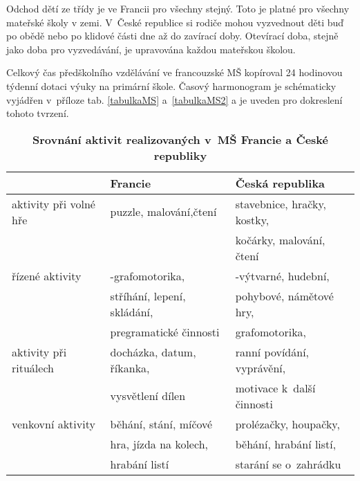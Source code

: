 	Odchod dětí ze třídy je ve Francii pro všechny stejný. Toto je platné pro všechny mateřské školy v zemi. V~České republice si rodiče mohou vyzvednout děti buď po obědě nebo po klidové části dne až do zavírací doby. Otevírací doba, stejně jako doba pro vyzvedávání, je upravována každou mateřskou školou.

	Celkový čas předškolního vzdělávání ve francouzské MŠ kopíroval 24 hodinovou týdenní dotaci výuky na primární škole. Časový harmonogram je schématicky vyjádřen v~příloze tab. \ref{tabulkaMS} a~\ref{tabulkaMS2} a je uveden pro dokreslení tohoto tvrzení.


\begin{table}[h]
	\center
	\begin{tabular}{|l|l|l|}
	\hline
	\rowcolor{grey}
								& \textbf{Francie}				& \textbf{Česká republika}	\\
	\hline
	\hline
\rowcolor{grey!10}	 aktivity při volné hře	&puzzle, malování,čtení 	&stavebnice, hračky, kostky,\\ 
\rowcolor{grey!10}	 						&							&kočárky, malování, čtení \\ 
\rowcolor{grey!50}	 řízené aktivity  		&\uv{práce}-grafomotorika, 	&\uv{hra}-výtvarné, hudební, \\ 
\rowcolor{grey!50}	 						&stříhání, lepení, skládání,&pohybové, námětové hry, \\ 
\rowcolor{grey!50}	 						&pregramatické činnosti 	&grafomotorika, \\
\rowcolor{grey!10}	 aktivity při rituálech &docházka, datum, říkanka, 	&ranní povídání, vyprávění,\\ 
\rowcolor{grey!10}	 						&vysvětlení dílen			& motivace k~další činnosti\\ 
\rowcolor{grey!50}   venkovní aktivity 		& běhání, stání, míčové		& prolézačky, houpačky, \\
\rowcolor{grey!50}							&hra, jízda na kolech, 		&běhání, hrabání listí,	\\
\rowcolor{grey!50}							&hrabání listí				&starání se o~zahrádku	\\
	 \hline
	\end{tabular}
	
	\caption{ \textbf{Srovnání aktivit realizovaných v~MŠ Francie a České republiky}
	}
	\label{srovnaniaktivit}
\end{table}
	
